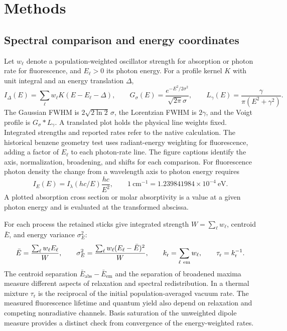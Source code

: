 \documentclass[11pt]{article}
\newcommand{\wn}{\ensuremath{\mathrm{cm}^{-1}}}
\begin{document}
\FloatBarrier
\section{Methods}




\subsection{Spectral comparison and energy coordinates}

Let $w_\ell$ denote a population-weighted oscillator strength for absorption or photon rate for fluorescence, and $E_\ell>0$ its photon energy. For a profile kernel $K$ with unit integral and an energy translation $\Delta$,
\begin{equation}
 I_{\Delta}(E)=\sum_\ell w_\ell K(E-E_\ell-\Delta),\qquad
 G_\sigma(E)=\frac{e^{-E^2/2\sigma^2}}{\sqrt{2\pi}\sigma},\qquad
 L_\gamma(E)=\frac{\gamma}{\pi(E^2+\gamma^2)}.
 \label{eq:profiles}
\end{equation}
The Gaussian FWHM is $2\sqrt{2\ln 2}\,\sigma$, the Lorentzian FWHM is $2\gamma$, and the Voigt profile is $G_\sigma*L_\gamma$. A translated plot holds the physical line weights fixed. Integrated strengths and reported rates refer to the native calculation. The historical benzene geometry test uses radiant-energy weighting for fluorescence, adding a factor of $E_\ell$ to each photon-rate line. The figure captions identify the axis, normalization, broadening, and shifts for each comparison. For fluorescence photon density the change from a wavelength axis to photon energy requires
\begin{equation}
 I_E(E)=I_\lambda(hc/E)\frac{hc}{E^2},\qquad
 1~\wn=1.239841984\times10^{-4}~\mathrm{eV}.
 \label{eq:jacobian}
\end{equation}
A plotted absorption cross section or molar absorptivity is a value at a given photon energy and is evaluated at the transformed abscissa.

For each process the retained sticks give integrated strength $W=\sum_\ell w_\ell$, centroid $\bar E$, and energy variance $\sigma_E^2$:
\begin{equation}
 \bar E=\frac{\sum_\ell w_\ell E_\ell}{W},\qquad
 \sigma_E^2=\frac{\sum_\ell w_\ell(E_\ell-\bar E)^2}{W},\qquad
 k_{\mathrm r}=\sum_{\ell\ {\rm em}}w_\ell,\qquad
 \tau_{\mathrm r}=k_{\mathrm r}^{-1}.
 \label{eq:reported-properties}
\end{equation}
The centroid separation $\bar E_{\mathrm{abs}}-\bar E_{\mathrm{em}}$ and the separation of broadened maxima measure different aspects of relaxation and spectral redistribution. In a thermal mixture $\tau_{\mathrm r}$ is the reciprocal of the initial population-averaged vacuum rate. The measured fluorescence lifetime and quantum yield also depend on relaxation and competing nonradiative channels. Basis saturation of the unweighted dipole measure provides a distinct check from convergence of the energy-weighted rates.
\end{document}
